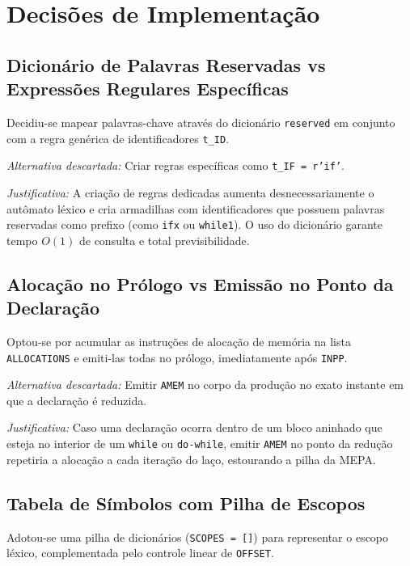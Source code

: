 \documentclass[12pt,a4paper]{article}
\begin{document}
\section{Decisões de Implementação}

\subsection{Dicionário de Palavras Reservadas vs Expressões Regulares Específicas}

Decidiu-se mapear palavras-chave através do dicionário \texttt{reserved} em conjunto
com a regra genérica de identificadores \texttt{t\_ID}.

\noindent\textit{Alternativa descartada:} Criar regras específicas como \texttt{t\_IF = r'if'}.

\noindent\textit{Justificativa:} A criação de regras dedicadas aumenta desnecessariamente
o autômato léxico e cria armadilhas com identificadores que possuem palavras reservadas
como prefixo (como \texttt{ifx} ou \texttt{while1}). O uso do dicionário garante tempo
$O(1)$ de consulta e total previsibilidade.

\subsection{Alocação no Prólogo vs Emissão no Ponto da Declaração}

Optou-se por acumular as instruções de alocação de memória na lista \texttt{ALLOCATIONS}
e emiti-las todas no prólogo, imediatamente após \texttt{INPP}.

\noindent\textit{Alternativa descartada:} Emitir \texttt{AMEM} no corpo da produção
no exato instante em que a declaração é reduzida.

\noindent\textit{Justificativa:} Caso uma declaração ocorra dentro de um bloco aninhado
que esteja no interior de um \texttt{while} ou \texttt{do-while}, emitir \texttt{AMEM}
no ponto da redução repetiria a alocação a cada iteração do laço, estourando a pilha da MEPA.

\subsection{Tabela de Símbolos com Pilha de Escopos}

Adotou-se uma pilha de dicionários (\texttt{SCOPES = []}) para representar o escopo
léxico, complementada pelo controle linear de \texttt{OFFSET}.
\end{document}
